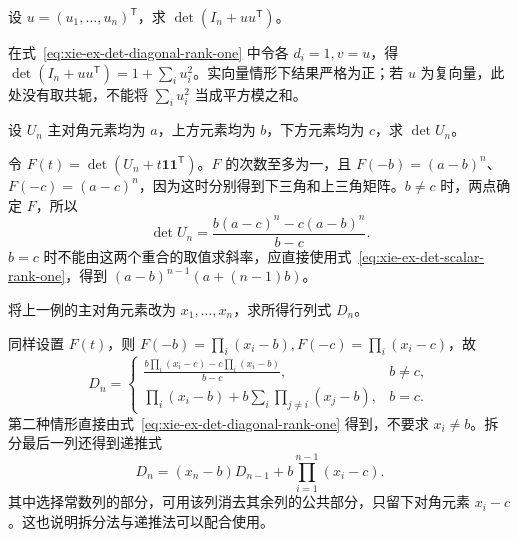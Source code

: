 \begin{example}
\label{ex:xie-ex-det-identity-update}
设 $u=(u_1,\ldots,u_n)^{\mathsf T}$，求 $\det(I_n+uu^{\mathsf T})$。
\end{example}

\begin{solve}
在式~\eqref{eq:xie-ex-det-diagonal-rank-one} 中令各 $d_i=1,v=u$，得 $\det(I_n+uu^{\mathsf T})=1+\sum_i u_i^2$。实向量情形下结果严格为正；若 $u$ 为复向量，此处没有取共轭，不能将 $\sum_i u_i^2$ 当成平方模之和。
\end{solve}

\begin{example}
\label{ex:xie-ex-det-uniform-triangle}
设 $U_n$ 主对角元素均为 $a$，上方元素均为 $b$，下方元素均为 $c$，求 $\det U_n$。
\end{example}

\begin{solve}
令 $F(t)=\det(U_n+t\mathbf1\mathbf1^{\mathsf T})$。$F$ 的次数至多为一，且 $F(-b)=(a-b)^n$、$F(-c)=(a-c)^n$，因为这时分别得到下三角和上三角矩阵。$b\ne c$ 时，两点确定 $F$，所以
\begin{equation}
\label{eq:xie-ex-det-uniform-triangle}
\det U_n=\frac{b(a-c)^n-c(a-b)^n}{b-c}.
\end{equation}
$b=c$ 时不能由这两个重合的取值求斜率，应直接使用式~\eqref{eq:xie-ex-det-scalar-rank-one}，得到 $(a-b)^{n-1}(a+(n-1)b)$。
\end{solve}

\begin{example}
\label{ex:xie-ex-det-variable-diagonal}
将上一例的主对角元素改为 $x_1,\ldots,x_n$，求所得行列式 $D_n$。
\end{example}

\begin{solve}
同样设置 $F(t)$，则 $F(-b)=\prod_i(x_i-b),F(-c)=\prod_i(x_i-c)$，故
\begin{equation}
\label{eq:xie-ex-det-variable-diagonal}
D_n=\begin{cases}
\displaystyle\frac{b\prod_i(x_i-c)-c\prod_i(x_i-b)}{b-c},&b\ne c,\\
\displaystyle\prod_i(x_i-b)+b\sum_i\prod_{j\ne i}(x_j-b),&b=c.
\end{cases}
\end{equation}
第二种情形直接由式~\eqref{eq:xie-ex-det-diagonal-rank-one} 得到，不要求 $x_i\ne b$。拆分最后一列还得到递推式
\[
D_n=(x_n-b)D_{n-1}+b\prod_{i=1}^{n-1}(x_i-c).
\]
其中选择常数列的部分，可用该列消去其余列的公共部分，只留下对角元素 $x_i-c$。这也说明拆分法与递推法可以配合使用。
\end{solve}

